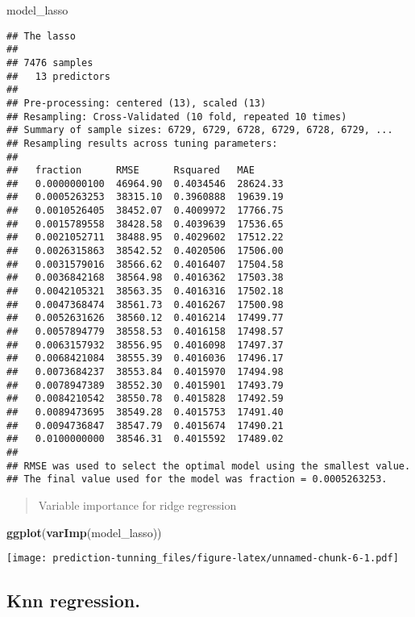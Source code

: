 \documentclass[]{article}
\newenvironment{Shaded}{\begin{snugshade}}{\end{snugshade}}
\newcommand{\KeywordTok}[1]{\textcolor[rgb]{0.13,0.29,0.53}{\textbf{#1}}}
\newcommand{\NormalTok}[1]{#1}
\begin{document}
\begin{Shaded}
\begin{Highlighting}[]
\NormalTok{model_lasso}
\end{Highlighting}
\end{Shaded}

\begin{verbatim}
## The lasso 
## 
## 7476 samples
##   13 predictors
## 
## Pre-processing: centered (13), scaled (13) 
## Resampling: Cross-Validated (10 fold, repeated 10 times) 
## Summary of sample sizes: 6729, 6729, 6728, 6729, 6728, 6729, ... 
## Resampling results across tuning parameters:
## 
##   fraction      RMSE      Rsquared   MAE     
##   0.0000000100  46964.90  0.4034546  28624.33
##   0.0005263253  38315.10  0.3960888  19639.19
##   0.0010526405  38452.07  0.4009972  17766.75
##   0.0015789558  38428.58  0.4039639  17536.65
##   0.0021052711  38488.95  0.4029602  17512.22
##   0.0026315863  38542.52  0.4020506  17506.00
##   0.0031579016  38566.62  0.4016407  17504.58
##   0.0036842168  38564.98  0.4016362  17503.38
##   0.0042105321  38563.35  0.4016316  17502.18
##   0.0047368474  38561.73  0.4016267  17500.98
##   0.0052631626  38560.12  0.4016214  17499.77
##   0.0057894779  38558.53  0.4016158  17498.57
##   0.0063157932  38556.95  0.4016098  17497.37
##   0.0068421084  38555.39  0.4016036  17496.17
##   0.0073684237  38553.84  0.4015970  17494.98
##   0.0078947389  38552.30  0.4015901  17493.79
##   0.0084210542  38550.78  0.4015828  17492.59
##   0.0089473695  38549.28  0.4015753  17491.40
##   0.0094736847  38547.79  0.4015674  17490.21
##   0.0100000000  38546.31  0.4015592  17489.02
## 
## RMSE was used to select the optimal model using the smallest value.
## The final value used for the model was fraction = 0.0005263253.
\end{verbatim}

\begin{quote}
Variable importance for ridge regression
\end{quote}

\begin{Shaded}
\begin{Highlighting}[]
\KeywordTok{ggplot}\NormalTok{(}\KeywordTok{varImp}\NormalTok{(model_lasso))}
\end{Highlighting}
\end{Shaded}

\texttt{[image: prediction-tunning\_files/figure-latex/unnamed-chunk-6-1.pdf]}

\subsection{Knn regression.}\label{knn-regression.}
\end{document}
